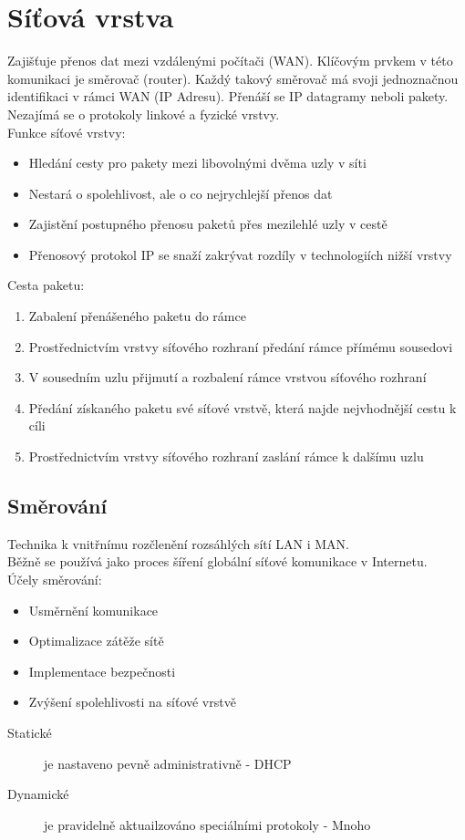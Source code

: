 \section{Síťová vrstva}
Zajišťuje přenos dat mezi vzdálenými počítači (WAN).
Klíčovým prvkem v této komunikaci je směrovač (router).
Každý takový směrovač má svoji jednoznačnou identifikaci v rámci WAN (IP Adresu).
Přenáší se IP datagramy neboli pakety. Nezajímá se o protokoly linkové a fyzické vrstvy.\\
Funkce síťové vrstvy:
\begin{itemize}
  \item Hledání cesty pro pakety mezi libovolnými dvěma uzly v síti
  \item Nestará o spolehlivost, ale o co nejrychlejší přenos dat
  \item Zajistění postupného přenosu paketů přes mezilehlé uzly v cestě
  \item Přenosový protokol IP se snaží zakrývat rozdíly v technologiích nižší vrstvy
\end{itemize}
Cesta paketu:
\begin{enumerate}
  \item Zabalení přenášeného paketu do rámce
  \item Prostřednictvím vrstvy síťového rozhraní předání rámce přímému sousedovi
  \item V sousedním uzlu přijmutí a rozbalení rámce vrstvou síťového rozhraní
  \item Předání získaného paketu své síťové vrstvě, která najde nejvhodnější cestu k cíli
  \item Prostřednictvím vrstvy síťového rozhraní zaslání rámce k dalšímu uzlu
\end{enumerate}
\subsection{Směrování}
Technika k vnitřnímu rozčlenění rozsáhlých sítí LAN i MAN.\\
Běžně se používá jako proces šíření globální síťové komunikace v Internetu.\\
Účely směrování:
\begin{itemize}
  \item Usměrnění komunikace
  \item Optimalizace zátěže sítě
  \item Implementace bezpečnosti
  \item Zvýšení spolehlivosti na síťové vrstvě
\end{itemize}
\begin{description}
  \item[Statické]je nastaveno pevně administrativně - DHCP
  \item[Dynamické]je pravidelně aktuailzováno speciálními protokoly - Mnoho
\end{description}
